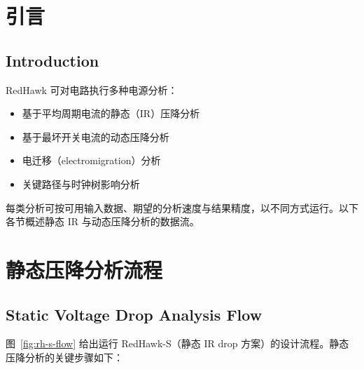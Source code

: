 \label{chap:flow}

\section{引言}
\subsection*{Introduction}

RedHawk 可对电路执行多种电源分析：
\begin{itemize}
  \item 基于平均周期电流的静态（IR）压降分析
  \item 基于最坏开关电流的动态压降分析
  \item 电迁移（electromigration）分析
  \item 关键路径与时钟树影响分析
\end{itemize}

每类分析可按可用输入数据、期望的分析速度与结果精度，以不同方式运行。以下各节概述静态 IR 与动态压降分析的数据流。

\section{静态压降分析流程}
\subsection*{Static Voltage Drop Analysis Flow}

图~\ref{fig:rh-s-flow} 给出运行 RedHawk-S（静态 IR drop 方案）的设计流程。静态压降分析的关键步骤如下：


